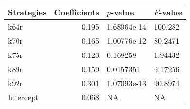 \begin{tabular}{lrll}
\toprule
Strategies &  Coefficients &    $p$-value & $F$-value \\
\midrule
      k64r &         0.195 &  1.68964e-14 &   100.282 \\
      k70r &         0.165 &  1.00776e-12 &   80.2471 \\
      k75r &         0.123 &     0.168258 &   1.94432 \\
      k89r &         0.159 &    0.0157351 &   6.17256 \\
      k92r &         0.301 &  1.07093e-13 &   90.8974 \\
 Intercept &         0.068 &           NA &        NA \\
\bottomrule
\end{tabular}
